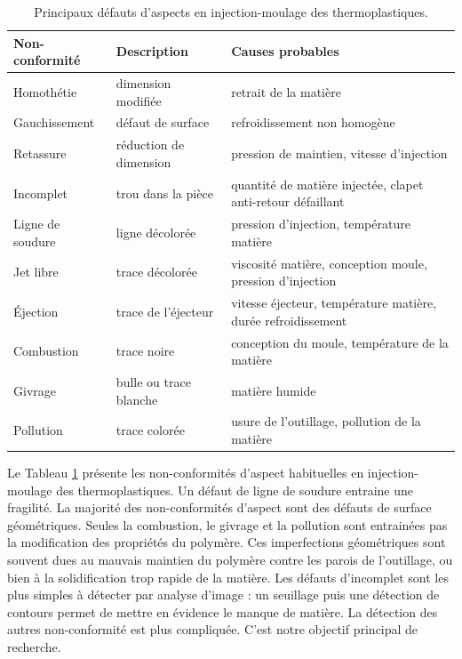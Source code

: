 \begin{table}[htbp]
	\hspace*{-3mm}
	\begin{tabular}{|l|l|l|}
		\arrayrulecolor{black}
		\hline
		Non-conformité & Description & Causes probables \\ \hline \hline
		Homothétie & dimension modifiée & retrait de la matière \\ \hline
		Gauchissement & défaut de surface & refroidissement non homogène \\ \hline
		Retassure  & réduction de dimension & pression de maintien, vitesse d'injection \\ \hline
		Incomplet & trou dans la pièce & quantité de matière injectée, clapet anti-retour défaillant \\ \hline
		Ligne de soudure & ligne décolorée &  pression d'injection, température matière \\ \hline
		Jet libre & trace décolorée & viscosité matière, conception moule, pression d'injection \\ \hline
		Éjection & trace de l'éjecteur & vitesse éjecteur, température matière, durée refroidissement \\ \hline \hline
		Combustion & trace noire & conception du moule, température de la matière \\ \hline
		Givrage & bulle ou trace blanche & matière humide \\ \hline
		Pollution & trace colorée & usure de l'outillage, pollution de la matière \\ \hline
	\end{tabular}
	\caption{Principaux défauts d'aspects en injection-moulage des thermoplastiques.}
	\label{tab:visual_defect}
\end{table}

Le Tableau \ref{tab:visual_defect} présente les non-conformités d'aspect habituelles en injection-moulage des thermoplastiques.
Un défaut de ligne de soudure entraine une fragilité.
La majorité des non-conformités d'aspect sont des défauts de surface géométriques.
Seules la combustion, le givrage et la pollution sont entrainées pas la modification des propriétés du polymère.
Ces imperfections géométriques sont souvent dues au mauvais maintien du polymère contre les parois de l'outillage, ou bien à la solidification trop rapide de la matière.
Les défauts d'incomplet sont les plus simples à détecter par analyse d'image : un seuillage puis une détection de contours permet de mettre en évidence le manque de matière.
La détection des autres non-conformité est plus compliquée.
C'est notre objectif principal de recherche.

